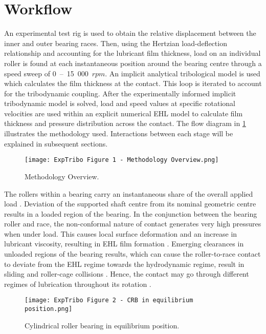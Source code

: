 \section{Workflow}

An experimental test rig is used to obtain the relative displacement between the inner and outer bearing races. Then, using the Hertzian load-deflection relationship and accounting for the lubricant film thickness, load on an individual roller is found at each instantaneous position around the bearing centre through a speed sweep of 0~–~15~000~$rpm$. An implicit analytical tribological model is used which calculates the film thickness at the contact. This loop is iterated to account for the tribodynamic coupling. After the experimentally informed implicit tribodynamic model is solved, load and speed values at specific rotational velocities are used within an explicit numerical EHL model to calculate film thickness and pressure distribution across the contact. The flow diagram in \ref{Experimental Tribodynamics Methodology Overview} illustrates the methodology used. Interactions between each stage will be explained in subsequent sections.

\begin{figure}
	\centerline{\texttt{[image: ExpTribo Figure 1 - Methodology Overview.png]}}
	\caption{Methodology Overview.}
	\label{Experimental Tribodynamics Methodology Overview}
\end{figure}

The rollers within a bearing carry an instantaneous share of the overall applied load \cite{Guo2020}. Deviation of the supported shaft centre from its nominal geometric centre results in a loaded region of the bearing. In the conjunction between the bearing roller and race, the non-conformal nature of contact generates very high pressures when under load. This causes local surface deformation and an increase in lubricant viscosity, resulting in EHL film formation \cite{Gohar1988} \cite{Grubin1949}. Emerging clearances in unloaded regions of the bearing results, which can cause the roller-to-race contact to deviate from the EHL regime towards the hydrodynamic regime, result in sliding and roller-cage collisions \cite{Mohammadpour2015c}. Hence, the contact may go through different regimes of lubrication throughout its rotation \cite{Denni2019}.

\begin{figure}
	\centerline{\texttt{[image: ExpTribo Figure 2 - CRB in equilibrium position.png]}}
	\caption{Cylindrical roller bearing in equilibrium position.}
	\label{CRB in equilibrium position}
\end{figure}

